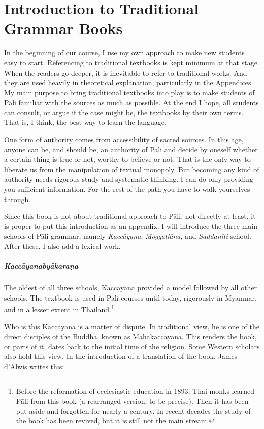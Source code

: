 \chapter{Introduction to Traditional Grammar Books}\label{chap:textbook}

In the beginning of our course, I use my own approach to make new students easy to start. Referencing to traditional textbooks is kept minimum at that stage. When the readers go deeper, it is inevitable to refer to traditional works. And they are used heavily in theoretical explanation, particularly in the Appendices. My main purpose to bring traditional textbooks into play is to make students of P\=ali familiar with the sources as much as possible. At the end I hope, all students can consult, or argue if the case might be, the textbooks by their own terms. That is, I think, the best way to learn the language. 

One form of authority comes from accessibility of sacred sources. In this age, anyone can be, and should be, an authority of P\=ali and decide by oneself whether a certain thing is true or not, worthy to believe or not. That is the only way to liberate us from the manipulation of textual monopoly. But becoming any kind of authority needs rigorous study and systematic thinking. I can do only providing you sufficient information. For the rest of the path you have to walk yourselves through.

Since this book is not about traditional approach to P\=ali, not directly at least, it is proper to put this introduction as an appendix. I will introduce the three main schools of P\=ali grammar, namely \emph{Kacc\=ayana}, \emph{Moggall\=ana}, and \emph{Saddan\=iti} school. After these, I also add a lexical work.

\paragraph*{Kacc\=ayanaby\=akara\d na} The oldest of all three schools, Kacc\=ayana provided a model followed by all other schools. The textbook is used in P\=ali courses until today, rigorously in Myanmar, and in a lesser extent in Thailand.\footnote{Before the reformation of ecclesiastic education in 1893, Thai monks learned P\=ali from this book (a rearranged version, to be precise). Then it has been put aside and forgotten for nearly a century. In recent decades the study of the book has been revived, but it is still not the main stream.}

Who is this Kacc\=ayana is a matter of dispute. In traditional view, he is one of the direct disciples of the Buddha, known as Mah\=akacc\=ayana. This renders the book, or parts of it, dates back to the initial time of the religion. Some Western scholars also hold this view. In the introduction of a translation of the book, James d'Alwis writes this:

